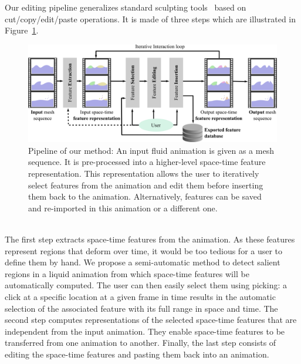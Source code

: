 Our editing pipeline generalizes standard sculpting tools~\cite{Ferley2000} based on cut/copy/edit/paste operations.
It is made of three steps which are illustrated in Figure~\ref{fig:overview}. 
\begin{figure}[!h]
	\centering
	\includegraphics[width=\linewidth]{images/fluidsculpting-mig2016/overview_2.png}
	\caption[Fluid sculpting: Overview]{
		Pipeline of our method: 
		An input fluid animation is given as a mesh sequence. 
		It is pre-processed into a higher-level space-time feature representation. 
		This representation allows the user to iteratively select features from the animation and edit them before inserting them back to the animation. 
		Alternatively, features can be saved and re-imported in this animation or a different one. }
	\label{fig:overview}
\end{figure}
\\
The first step extracts space-time features from the animation. As these features represent regions that deform over time, it would be too tedious for a user to define them by hand. We propose a semi-automatic method to detect salient regions in a liquid animation from which space-time features will be automatically computed. 
The user can then easily select them using picking: a click at a specific location at a given frame in time results in the automatic selection of the associated feature with its full range in space and time.
The second step computes representations of the selected space-time features that are independent from the input animation.
They enable space-time features to be transferred from one animation to another. 
Finally, the last step consists of editing the space-time features and pasting them back into an animation.



